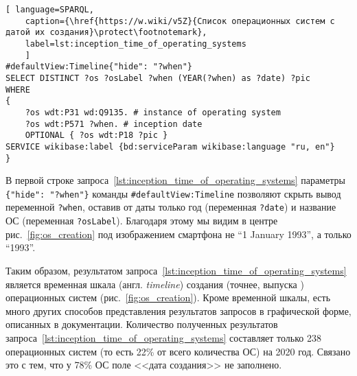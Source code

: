 \begin{lstlisting}[ language=SPARQL, 
	caption={\href{https://w.wiki/v5Z}{Список операционных систем с датой их создания}\protect\footnotemark},
	label=lst:inception_time_of_operating_systems
	]
#defaultView:Timeline{"hide": "?when"}
SELECT DISTINCT ?os ?osLabel ?when (YEAR(?when) as ?date) ?pic
WHERE
{
	?os wdt:P31 wd:Q9135. # instance of operating system
	?os wdt:P571 ?when. # inception date
	OPTIONAL { ?os wdt:P18 ?pic }
SERVICE wikibase:label {bd:serviceParam wikibase:language "ru, en"}
}
\end{lstlisting}


%
В первой строке запроса~\ref{lst:inception_time_of_operating_systems} 
параметры \lstinline|{"hide": "?when"}| 
команды \lstinline|#defaultView:Timeline| позволяют скрыть вывод переменной \lstinline|?when|, 
оставив от даты только год (переменная \lstinline|?date|) 
и название ОС (переменная \lstinline|?osLabel|). 
Благодаря этому мы видим в центре рис.~\ref{fig:os_creation} 
под изображением смартфона не ``1 January 1993'', а только ``1993''. 

Таким образом, результатом запроса~\ref{lst:inception_time_of_operating_systems} 
является временная шкала (англ. \textit{timeline}) создания (точнее, выпуска%
) %
операционных систем (рис.~\ref{fig:os_creation}). 
Кроме временной шкалы, есть много других способов представления результатов запросов 
в графической форме, описанных в документации\autocite{WQSResultViews}. 
Количество полученных результатов запроса~\ref{lst:inception_time_of_operating_systems} 
составляет только 238 операционных систем (то есть 22\% от всего количества ОС) на 2020 год. 
Связано это с тем, что у 78\% ОС поле <<дата создания>> не заполнено.

